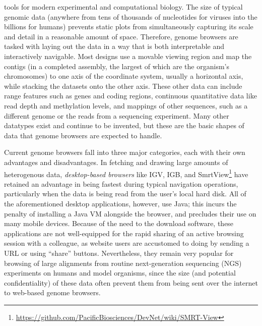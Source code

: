  tools for modern experimental and computational biology. The size of typical genomic data (anywhere from tens of thousands of nucleotides for viruses into the billions for humans) prevents static plots from simultaneously capturing its scale and detail in a reasonable amount of space. Therefore, genome browsers are tasked with laying out the data in a way that is both interpretable and interactively navigable. Most designs use a movable viewing region and map the contigs (in a completed assembly, the largest of which are the organism's chromosomes) to one axis of the coordinate system, usually a horizontal axis, while stacking the datasets onto the other axis. These other data can include range features such as genes and coding regions, continuous quantitative data like read depth and methylation levels, and mappings of other sequences, such as a different genome or the reads from a sequencing experiment. Many other datatypes exist and continue to be invented, but these are the basic shapes of data that genome browsers are expected to handle.

Current genome browsers fall into three major categories, each with their own advantages and disadvantages. In fetching and drawing large amounts of heterogenous data, \emph{desktop-based browsers} like IGV,\autocite{Thorvaldsdottir2013} IGB,\autocite{Freese2016} and SmrtView\footnote{\url{https://github.com/PacificBiosciences/DevNet/wiki/SMRT-View}} have retained an advantage in being fastest during typical navigation operations, particularly when the data is being read from the user's local hard disk. All of the aforementioned desktop applications, however, use Java; this incurs the penalty of installing a Java VM alongside the browser, and precludes their use on many mobile devices. Because of the need to the download software, these applications are not well-equipped for the rapid sharing of an active browsing session with a colleague, as website users are accustomed to doing by sending a URL or using ``share'' buttons. Nevertheless, they remain very popular for browsing of large alignments from routine next-generation sequencing (NGS) experiments on humans and model organisms, since the size (and potential confidentiality) of these data often prevent them from being sent over the internet to web-based genome browsers. 

